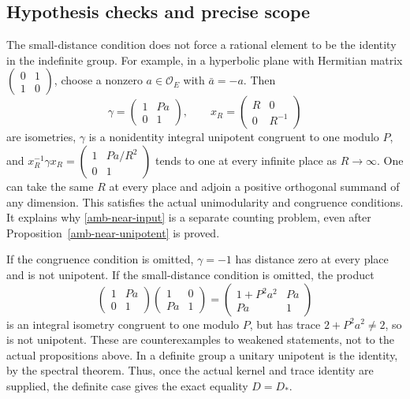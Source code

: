 \subsection{Hypothesis checks and precise scope}

The small-distance condition does not force a rational element
to be the identity in the indefinite group. For example, in a
hyperbolic plane with Hermitian matrix
$\begin{pmatrix}0&1\\1&0\end{pmatrix}$, choose a nonzero
$a\in\mathcal O_E$ with $\bar a=-a$. Then
\[
 \gamma=\begin{pmatrix}1&Pa\\0&1\end{pmatrix},\qquad
 x_R=\begin{pmatrix}R&0\\0&R^{-1}\end{pmatrix}
\]
are isometries, $\gamma$ is a nonidentity integral unipotent
congruent to one modulo $P$, and
$x_R^{-1}\gamma x_R=\begin{pmatrix}1&Pa/R^2\\0&1\end{pmatrix}$
tends to one at every infinite place as $R\to\infty$.
One can take the same $R$ at every place and adjoin a positive
orthogonal summand of any dimension. This satisfies the actual
unimodularity and congruence conditions. It explains why
\eqref{amb-near-input} is a separate counting problem, even
after Proposition~\ref{amb-near-unipotent} is proved.

If the congruence condition is omitted, $\gamma=-1$ has distance
zero at every place and is not unipotent. If the small-distance
condition is omitted, the product
\[
 \begin{pmatrix}1&Pa\\0&1\end{pmatrix}
 \begin{pmatrix}1&0\\Pa&1\end{pmatrix}
 =\begin{pmatrix}1+P^2a^2&Pa\\Pa&1\end{pmatrix}
\]
is an integral isometry congruent to one modulo $P$, but has
trace $2+P^2a^2\ne2$, so is not unipotent. These are
counterexamples to weakened statements, not to the actual
propositions above. In a definite group a unitary unipotent is
the identity, by the spectral theorem. Thus, once the actual
kernel and trace identity are supplied, the definite case gives
the exact equality $D=D_*$.

